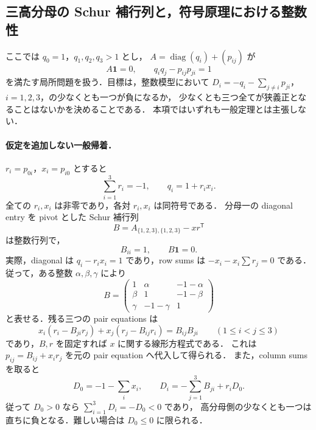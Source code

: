 \subsection{三高分母の Schur 補行列と，符号原理における整数性}
\label{sch12:three-high}

ここでは $q_0=1$，$q_1,q_2,q_3>1$ とし，
$A=\operatorname{diag}(q_i)+(p_{ij})$ が
\[
 A\mathbf1=0,\qquad q_iq_j-p_{ij}p_{ji}=1
\]
を満たす局所問題を扱う．目標は，整数模型において
$D_i=-q_i-\sum_{j\ne i}p_{ji}$，$i=1,2,3$，の少なくとも一つが負になるか，
少なくとも三つ全てが狭義正となることはないかを決めることである．
本項ではいずれも一般定理とは主張しない．

\paragraph{仮定を追加しない一般帰着．}
$r_i=p_{0i}$，$x_i=p_{i0}$ とすると
\[
 \sum_{i=1}^3r_i=-1,\qquad q_i=1+r_ix_i.
\]
全ての $r_i,x_i$ は非零であり，各対 $r_i,x_i$ は同符号である．
分母一の diagonal entry を pivot とした Schur 補行列
\[
 B=A_{\{1,2,3\},\{1,2,3\}}-xr^{\mathsf T}
\]
は整数行列で，
\begin{equation}\label{sch12:unit-diagonal}
 B_{ii}=1,\qquad B\mathbf1=0.
\end{equation}
実際，diagonal は $q_i-r_ix_i=1$ であり，row sums は
$-x_i-x_i\sum r_j=0$ である．従って，ある整数 $\alpha,\beta,\gamma$ により
\[
 B=\begin{pmatrix}
 1&\alpha&-1-\alpha\\
 \beta&1&-1-\beta\\
 \gamma&-1-\gamma&1
 \end{pmatrix}
\]
と表せる．残る三つの pair equations は
\begin{equation}\label{sch12:linear-x}
 x_i(r_i-B_{ji}r_j)+x_j(r_j-B_{ij}r_i)=B_{ij}B_{ji}
 \qquad(1\leq i<j\leq3)
\end{equation}
であり，$B,r$ を固定すれば $x$ に関する線形方程式である．
これは $p_{ij}=B_{ij}+x_ir_j$ を元の pair equation へ代入して得られる．
また，column sums を取ると
\begin{equation}\label{sch12:defect}
 D_0=-1-\sum_i x_i,\qquad
 D_i=-\sum_{j=1}^3B_{ji}+r_iD_0.
\end{equation}
従って $D_0>0$ なら $\sum_{i=1}^3D_i=-D_0<0$ であり，
高分母側の少なくとも一つは直ちに負となる．難しい場合は $D_0\leq0$ に限られる．

